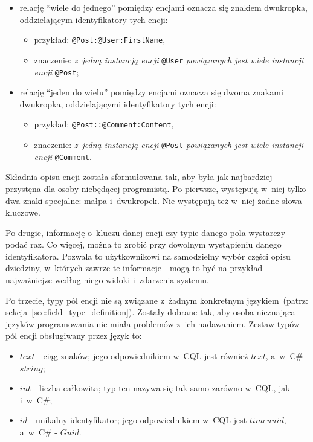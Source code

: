 \begin{itemize}
 \item relację ``wiele do jednego'' pomiędzy encjami oznacza się znakiem dwukropka, oddzielającym identyfikatory tych encji:
  \begin{itemize}
   \item przykład: \verb|@Post:@User:FirstName|,
   \item znaczenie: \emph{z~jedną instancją encji} \verb|@User| \emph{powiązanych jest wiele instancji encji} \verb|@Post|;
  \end{itemize}
 
 \item relację ``jeden do wielu'' pomiędzy encjami oznacza się dwoma znakami dwukropka, oddzielającymi identyfikatory tych encji:
  \begin{itemize}
   \item przykład: \verb|@Post::@Comment:Content|,
   \item znaczenie: \emph{z~jedną instancją encji} \verb|@Post| \emph{powiązanych jest wiele instancji encji} \verb|@Comment|.
  \end{itemize}
\end{itemize}

Składnia opisu encji została sformułowana tak, aby była jak najbardziej przystęna dla osoby niebędącej programistą.
Po pierwsze, występują w~niej tylko dwa znaki specjalne: małpa i~dwukropek.
Nie występują też w~niej żadne słowa kluczowe.

Po drugie, informację o~kluczu danej encji czy typie danego pola wystarczy podać raz.
Co więcej, można to zrobić przy dowolnym wystąpieniu danego identyfikatora.
Pozwala to użytkownikowi na samodzielny wybór części opisu dziedziny, w~których zawrze te informacje - mogą to być na przykład najważniejze według niego widoki i~zdarzenia systemu.

Po trzecie, typy pól encji nie są związane z~żadnym konkretnym językiem~(patrz: sekcja~\ref{sec:field_type_definition}).
Zostały dobrane tak, aby osoba nieznająca języków programowania nie miała problemów z~ich nadawaniem.
Zestaw typów pól encji obsługiwany przez język to:

\begin{itemize}
 \item $text$ - ciąg znaków; jego odpowiednikiem w~CQL jest również $text$, a~w~C\# - $string$;
 \item $int$ - liczba całkowita; typ ten nazywa się tak samo zarówno w~CQL, jak i~w~C\#;
 \item $id$ - unikalny identyfikator; jego odpowiednikiem w~CQL jest $timeuuid$, a~w~C\# - $Guid$.
\end{itemize}

